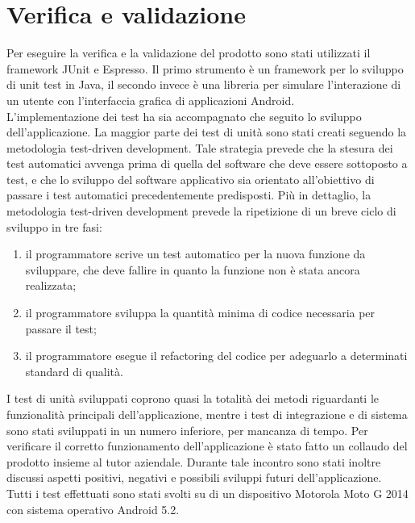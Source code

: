 \documentclass[../Tesi.tex]{subfiles}
\begin{document}
\section{Verifica e validazione}
	Per eseguire la verifica e la validazione del prodotto sono stati utilizzati il framework JUnit e Espresso. Il primo strumento è un framework per lo sviluppo di unit test in Java, il secondo invece è una libreria per 
	simulare l'interazione di un utente con l'interfaccia grafica di applicazioni Android. \\
	L'implementazione dei test ha sia accompagnato che seguito lo sviluppo dell'applicazione. La maggior parte dei test di unità sono stati creati seguendo la metodologia test-driven development. Tale strategia prevede che la stesura dei test automatici avvenga prima di quella del software che deve essere sottoposto a test, e che lo sviluppo del software applicativo sia orientato all'obiettivo di passare i test automatici precedentemente predisposti. Più in dettaglio, la metodologia test-driven development prevede la ripetizione di un breve ciclo di sviluppo in tre fasi:
	\begin{enumerate}
		\item il programmatore scrive un test automatico per la nuova funzione da sviluppare, che deve fallire in quanto la funzione non è stata ancora realizzata;
		\item il programmatore sviluppa la quantità minima di codice necessaria per passare il test;
		\item il programmatore esegue il refactoring del codice per adeguarlo a determinati standard di qualità.
	\end{enumerate}
	I test di unità sviluppati coprono quasi la totalità dei metodi riguardanti le funzionalità principali dell'applicazione, mentre i test di integrazione e di sistema sono stati sviluppati in un numero inferiore, per mancanza di tempo. Per verificare il corretto funzionamento dell'applicazione è stato fatto un collaudo del prodotto insieme al tutor aziendale. Durante tale incontro sono stati inoltre discussi aspetti positivi, negativi e possibili sviluppi futuri dell'applicazione.\\
	Tutti i test effettuati sono stati svolti su di un dispositivo Motorola Moto G 2014 con sistema operativo Android 5.2.
\end{document}
